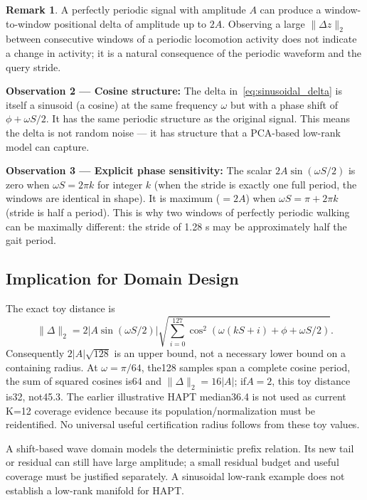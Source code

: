 \documentclass[11pt, a4paper]{article}
\theoremstyle{definition}
\newtheorem{remark}{Remark}[section]
\theoremstyle{plain}
\begin{document}
\begin{remark}
  A perfectly periodic signal with amplitude $A$ can produce a window-to-window
  positional delta of amplitude up to $2A$. Observing a large $\|\Delta z\|_2$
  between consecutive windows of a periodic locomotion activity does not indicate
  a change in activity; it is a natural consequence of the periodic waveform and
  the query stride.
\end{remark}

\textbf{Observation 2 — Cosine structure:}
The delta in~\eqref{eq:sinusoidal_delta} is itself a sinusoid (a cosine) at the same
frequency $\omega$ but with a phase shift of $\phi + \omega S/2$. It has the same
periodic structure as the original signal. This means the delta is not random noise
— it has structure that a PCA-based low-rank model can capture.

\textbf{Observation 3 — Explicit phase sensitivity:}
The scalar $2A\sin(\omega S / 2)$ is zero when $\omega S = 2\pi k$ for integer $k$
(when the stride is exactly one full period, the windows are identical in shape).
It is maximum ($= 2A$) when $\omega S = \pi + 2\pi k$ (stride is half a period).
This is why two windows of perfectly periodic walking can be maximally different:
the stride of 1.28 s may be approximately half the gait period.

\subsection{Implication for Domain Design}

The exact toy distance is
\[
 \|\Delta\|_2=2|A\sin(\omega S/2)|
 \sqrt{\sum_{i=0}^{127}\cos^2(\omega(kS+i)+\phi+\omega S/2)}.
\]
Consequently $2|A|\sqrt{128}$ is an upper bound, not a necessary lower
bound on a containing radius. At $\omega=\pi/64$, the128 samples span a
complete cosine period, the sum of squared cosines is64 and
$\|\Delta\|_2=16|A|$; if$A=2$, this toy distance is32, not45.3.
The earlier illustrative HAPT median36.4 is not used as current K=12
coverage evidence because its population/normalization must be reidentified.
No universal useful certification radius follows from these toy values.

A shift-based wave domain models the deterministic prefix relation.
Its new tail or residual can still have large amplitude; a small residual
budget and useful coverage must be justified separately. A sinusoidal
low-rank example does not establish a low-rank manifold for HAPT.

\end{document}
